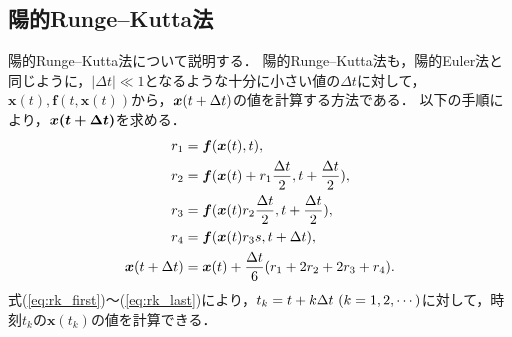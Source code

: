 \subsection{陽的Runge--Kutta法}
陽的Runge--Kutta法について説明する．
陽的Runge--Kutta法も，陽的Euler法と同じように，$|\Delta t| \ll 1 $となるような十分に小さい値の$\Delta t$に対して，$\bm{x}(t),\bm{f}(t,\bm{x}(t))$から，$\bm{x}(t + \Delta t )$の値を計算する方法である．
以下の手順により，$\bm{x(t + \Delta t)}$を求める．
\begin{align}
    r_1 &= \bm{f}(\bm{x}(t),t), \label{eq:rk_first}\\
    r_2 &= \bm{f}(\bm{x}(t)+r_1 \frac{\Delta t}{2},t + \frac{\Delta t}{2}), \\
    r_3 &= \bm{f}(\bm{x}(t)r_2 \frac{\Delta t}{2}, t + \frac{\Delta t}{2}), \\
    r_4 &= \bm{f}(\bm{x}(t)r_3 s, t + \Delta t), \\
    \bm{x}(t + \Delta t) &= \bm{x}(t) + \frac{\Delta t}{6}(r_1 + 2r_2 + 2r_3 + r_4). \label{eq:rk_last}
\end{align}
式(\ref{eq:rk_first})〜(\ref{eq:rk_last})により，$t_k = t + k\Delta t \ (k = 1,2,\cdots)$に対して，時刻$t_k$の$\bm{x}(t_k)$の値を計算できる．


